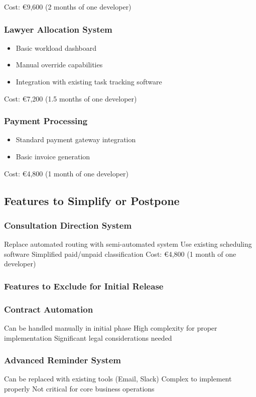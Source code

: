 \documentclass[11pt]{article}
\begin{document}
Cost: €9,600 (2 months of one developer)
\subsubsection{Lawyer Allocation System}
\label{sec:orgcdc6a05}

\begin{itemize}
\item Basic workload dashboard
\item Manual override capabilities
\item Integration with existing task tracking software
\end{itemize}

Cost: €7,200 (1.5 months of one developer)
\subsubsection{Payment Processing}
\label{sec:org5a9fd89}

\begin{itemize}
\item Standard payment gateway integration
\item Basic invoice generation
\end{itemize}

Cost: €4,800 (1 month of one developer)
\subsection{Features to Simplify or Postpone}
\label{sec:orgbd6bdc6}

\subsubsection{Consultation Direction System}
\label{sec:orgde0a6cd}

Replace automated routing with semi-automated system
Use existing scheduling software
Simplified paid/unpaid classification
Cost: €4,800 (1 month of one developer)
\subsubsection{Features to Exclude for Initial Release}
\label{sec:org35d4148}

\subsubsection{Contract Automation}
\label{sec:org145c9d9}

Can be handled manually in initial phase
High complexity for proper implementation
Significant legal considerations needed
\subsubsection{Advanced Reminder System}
\label{sec:org8b2d57a}

Can be replaced with existing tools (Email, Slack)
Complex to implement properly
Not critical for core business operations
\end{document}
